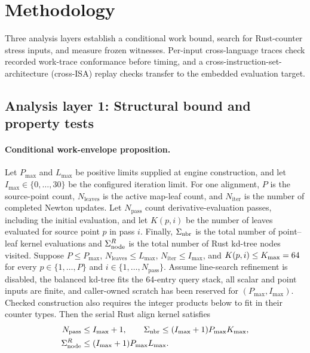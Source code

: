 \section{Methodology}
\label{sec:methodology}

Three analysis layers establish a conditional work bound, search for Rust-counter stress
inputs, and measure frozen witnesses. Per-input cross-language traces check recorded work-trace
conformance before timing, and a cross-instruction-set-architecture (cross-ISA) replay checks transfer to the
embedded evaluation target.

\subsection{Analysis layer 1: Structural bound and property tests}
\paragraph{Conditional work-envelope proposition.}
Let $P_{\max}$ and $L_{\max}$ be positive limits supplied at engine construction, and
let $I_{\max}\in\{0,\ldots,30\}$ be the configured iteration limit. For one
alignment, $P$ is the source-point count, $N_{\mathrm{leaves}}$ is the active map-leaf
count, and $N_{\mathrm{iter}}$ is the number of completed Newton updates. Let
$N_{\mathrm{pass}}$ count derivative-evaluation passes, including the initial evaluation,
and let $K(p,i)$ be the number of leaves evaluated for source point $p$ in pass $i$.
Finally, $\Sigma_{\mathrm{nbr}}$ is the total number of point--leaf kernel evaluations and $\Sigma_{\mathrm{node}}^{R}$
is the total number of Rust kd-tree nodes visited. Suppose $P\le P_{\max}$,
$N_{\mathrm{leaves}}\le L_{\max}$, $N_{\mathrm{iter}}\le I_{\max}$, and
$K(p,i)\le K_{\max}=64$ for every
$p\in\{1,\ldots,P\}$ and $i\in\{1,\ldots,N_{\mathrm{pass}}\}$. Assume line-search
refinement is disabled, the balanced kd-tree fits
the 64-entry query stack, all scalar and point inputs are finite, and caller-owned scratch
has been reserved for $(P_{\max},I_{\max})$. Checked construction also requires the
integer products below to fit in their counter types. Then the serial Rust align kernel
satisfies
\begin{equation}
 \begin{aligned}
 N_{\mathrm{pass}}&\le I_{\max}+1,\qquad
 \Sigma_{\mathrm{nbr}}\le(I_{\max}+1)P_{\max}K_{\max},\\
 \Sigma_{\mathrm{node}}^{R}&\le(I_{\max}+1)P_{\max}L_{\max}.
 \end{aligned}
 \label{eq:rust-envelope}
\end{equation}
